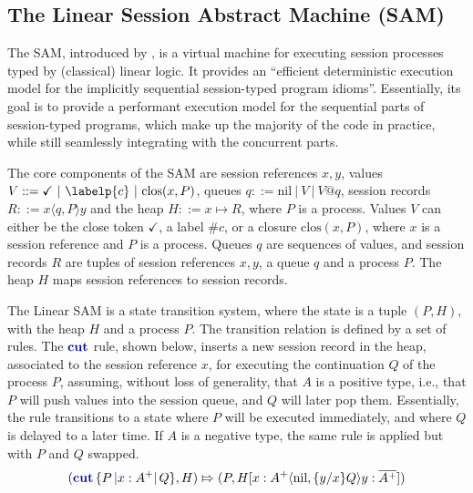 \documentclass[sigconf,nonacm,natbib=true]{acmart}
\begin{document}


\subsection{The Linear Session Abstract Machine (SAM)}

The \ac{SAM}, introduced by \citet{Caires:2024}, is a virtual machine for executing session processes typed by (classical) linear logic. It provides an ``efficient deterministic execution model for the implicitly sequential session-typed program idioms''. Essentially, its goal is to provide a performant execution model for the sequential parts of session-typed programs, which make up the majority of the code in practice, while still seamlessly integrating with the concurrent parts.

The core components of the \ac{SAM} are session references $x, y$, values $V ::= \checkmark\ |\ \labelp{c}\ |\ \text{clos}(x, P)$, queues $q ::= \text{nil}\ |\ V\ |\ V@q$, session records $R ::= x\langle q,P\rangle y$ and the heap $H ::= x \mapsto R$, where $P$ is a process. Values $V$ can either be the close token $\checkmark$, a label $\#c$, or a closure $\text{clos}(x, P)$, where $x$ is a session reference and $P$ is a process. Queues $q$ are sequences of values, and session records $R$ are tuples of session references $x, y$, a queue $q$ and a process $P$. The heap $H$ maps session references to session records.

The Linear \ac{SAM} is a state transition system, where the state is a tuple $(P, H)$, with the heap $H$ and a process $P$. The transition relation is defined by a set of rules. The $\cutp$ rule, shown below, inserts a new session record in the heap, associated to the session reference $x$, for executing the continuation $Q$ of the process $P$, assuming, without loss of generality, that $A$ is a positive type, i.e., that $P$ will push values into the session queue, and $Q$ will later pop them. Essentially, the rule transitions to a state where $P$ will be executed immediately, and where $Q$ is delayed to a later time. If $A$ is a negative type, the same rule is applied but with $P$ and $Q$ swapped.
\[
    (\cutc{P}{x: A^+}{Q}, H)
    \Mapsto
    (P, H[x: A^+\langle\text{nil},\{y/x\}Q\rangle y:\dual{A^+}])
\]
\end{document}
